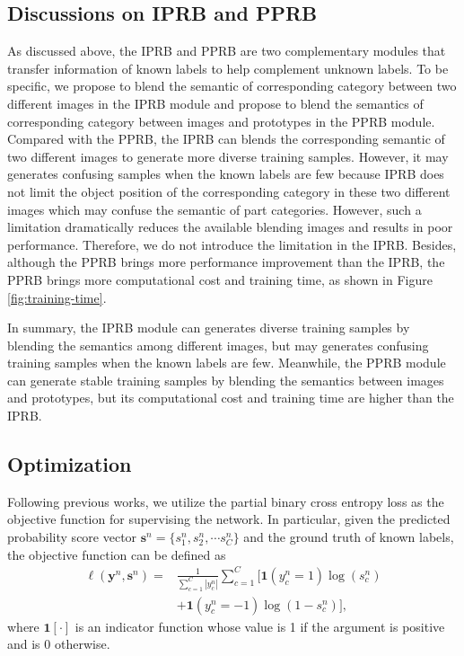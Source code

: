 \documentclass[lettersize,journal]{IEEEtran}
\begin{document}
\subsection{Discussions on IPRB and PPRB}
As discussed above, the IPRB and PPRB are two complementary modules that transfer information of known labels to help complement unknown labels. To be specific, we propose to blend the semantic of  corresponding category between two different images in the IPRB module and propose to blend the semantics of corresponding category between images and prototypes in the PPRB module. Compared with the PPRB, the IPRB can blends the corresponding semantic of two different images to generate more diverse training samples. However, it may generates confusing samples when the known labels are few because IPRB does not limit the object position of the corresponding category in these two different images which may confuse the semantic of part categories. However, such a limitation dramatically reduces the available blending images and results in poor performance. Therefore, we do not introduce the limitation in the IPRB. Besides, although the PPRB brings more performance improvement than the IPRB, the PPRB brings more computational cost and training time, as shown in Figure \ref{fig:training-time}.

In summary, the IPRB module can generates diverse training samples by blending the semantics among different images, but may generates confusing training samples when the known labels are few. Meanwhile, the PPRB module can generate stable training samples by blending the semantics between images and prototypes, but its computational cost and training time are higher than the IPRB.

\subsection{Optimization}
Following previous works, we utilize the partial binary cross entropy loss as the objective function for supervising the network. In particular, given the predicted probability score vector $\textbf{s}^n=\{s^n_1, s^n_2, \cdots s^n_C\}$ and the ground truth of known labels, the objective function can be defined as 
\begin{equation}
\begin{aligned}
\ell(\textbf{y}^n, \textbf{s}^n)=&\frac{1}{\sum_{c=1}^C|y^n_c|}\sum_{c=1}^C[\textbf{1}(y^n_c=1)\log(s^n_c) \\
&+\textbf{1}(y^n_c=-1)\log(1-s^n_c)],
\end{aligned}
\end{equation}
where $\textbf{1}[\cdot]$ is an indicator function whose value is 1 if the argument is positive and is 0 otherwise.
\end{document}
